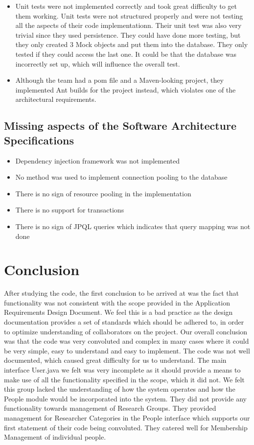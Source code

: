 \documentclass{article}
\begin{document}
	\begin{itemize}
		
		\item Unit tests were not implemented correctly and took great difficulty to get them working. Unit tests were not structured properly and were not testing all the aspects of their code implementationn. Their unit test was also very trivial since they used persistence. They could have done more testing, but they only created 3 Mock objects and put them into the database. They only tested if they could access the last one. It could be that the database was incorrectly set up, which will influence the overall test.
	\item Although the team had a pom file and a Maven-looking project, they implemented Ant builds for the project instead, which violates one of the architectural requirements.
\end{itemize}
	
	\subsection{Missing aspects of the Software Architecture Specifications}
	\begin{itemize}
		\item Dependency injection framework was not implemented
		\item No method was used to implement connection pooling to the database
		\item There is no sign of resource pooling in the implementation
		\item There is no support for transactions
		\item There is no sign of JPQL queries which indicates that query mapping was not done
	\end{itemize}
	
	
	\section{Conclusion}
	After studying the code, the first conclusion to be arrived at was the fact that functionality was not consistent with the scope provided in the Application Requirements Design Document. We feel this is a bad practice as the design documentation provides a set of standards which should be adhered to, in order to optimize understanding of collaborators on the project.  Our overall conclusion was that the code was very convoluted and complex in many cases where it could be very simple, easy to understand and easy to implement. The code was not well documented, which caused great difficulty for us to understand. The main interface User.java we felt was very incomplete as it should provide a means to make use of all the functionality specified in the scope, which it did not. We felt this group lacked the understanding of how the system operates and how the People module would be incorporated into the system. They did not provide any functionality towards management of Research Groups. They provided management for Researcher Categories in the People interface which supports our first statement of their code being convoluted. They catered well for Membership Management of individual people.
\end{document}
